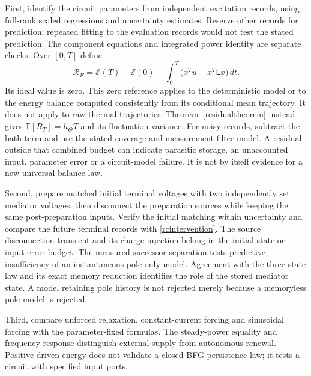 \documentclass[11pt,letterpaper]{article}
\theoremstyle{definition}
\numberwithin{equation}{section}
\begin{document}
First, identify the circuit parameters from independent excitation records, using full-rank scaled regressions and uncertainty estimates. Reserve other records for prediction; repeated fitting to the evaluation records would not test the stated prediction. The component equations and integrated power identity are separate checks. Over $[0,T]$ define
\begin{equation}\label{rcenergyresidual}
\mathcal R_E=\mathcal E(T)-\mathcal E(0)-\int_0^T\big(x^Tu-x^T\mathsf Lx\big)\,dt.
\end{equation}
Its ideal value is zero. This zero reference applies to the deterministic model or to the energy balance computed consistently from its conditional mean trajectory. It does not apply to raw thermal trajectories: Theorem~\ref{residualtheorem} instead gives $\mathbb E[R_T]=h_\Theta T$ and its fluctuation variance. For noisy records, subtract the bath term and use the stated coverage and measurement-filter model. A residual outside that combined budget can indicate parasitic storage, an unaccounted input, parameter error or a circuit-model failure. It is not by itself evidence for a new universal balance law.

Second, prepare matched initial terminal voltages with two independently set mediator voltages, then disconnect the preparation sources while keeping the same post-preparation inputs. Verify the initial matching within uncertainty and compare the future terminal records with \eqref{rcintervention}. The source disconnection transient and its charge injection belong in the initial-state or input-error budget. The measured successor separation tests predictive insufficiency of an instantaneous pole-only model. Agreement with the three-state law and its exact memory reduction identifies the role of the stored mediator state. A model retaining pole history is not rejected merely because a memoryless pole model is rejected.

Third, compare unforced relaxation, constant-current forcing and sinusoidal forcing with the parameter-fixed formulas. The steady-power equality and frequency response distinguish external supply from autonomous renewal. Positive driven energy does not validate a closed BFG persistence law; it tests a circuit with specified input ports.
\end{document}
